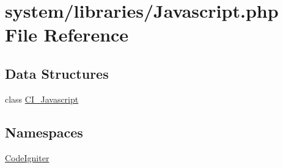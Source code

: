 \hypertarget{_javascript_8php}{}\section{system/libraries/\+Javascript.php File Reference}
\label{_javascript_8php}
\subsection*{Data Structures}
\begin{DoxyCompactItemize}
\item 
class \mbox{\hyperlink{class_c_i___javascript}{C\+I\+\_\+\+Javascript}}
\end{DoxyCompactItemize}
\subsection*{Namespaces}
\begin{DoxyCompactItemize}
\item 
 \mbox{\hyperlink{namespace_code_igniter}{Code\+Igniter}}
\end{DoxyCompactItemize}
